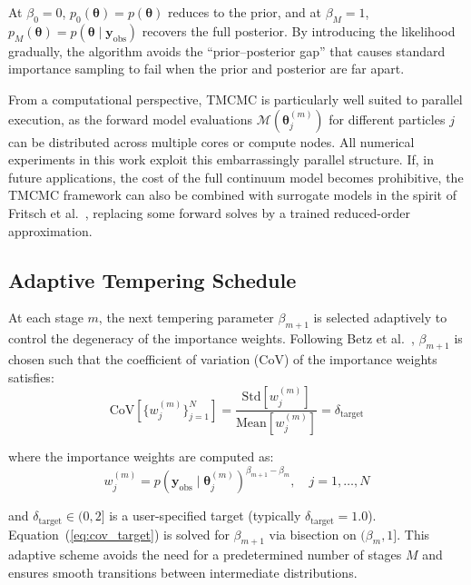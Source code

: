 \documentclass[11pt,a4paper]{article}
\begin{document}
\noindent At $\beta_0 = 0$, $p_0(\boldsymbol{\theta}) = p(\boldsymbol{\theta})$ reduces to the prior, and at $\beta_M = 1$, $p_M(\boldsymbol{\theta}) = p(\boldsymbol{\theta} \mid \mathbf{y}_{\mathrm{obs}})$ recovers the full posterior. By introducing the likelihood gradually, the algorithm avoids the ``prior--posterior gap'' that causes standard importance sampling to fail when the prior and posterior are far apart.

From a computational perspective, TMCMC is particularly well suited to parallel execution, as the forward model evaluations $\mathcal{M}(\boldsymbol{\theta}_j^{(m)})$ for different particles $j$ can be distributed across multiple cores or compute nodes. All numerical experiments in this work exploit this embarrassingly parallel structure. If, in future applications, the cost of the full continuum model becomes prohibitive, the TMCMC framework can also be combined with surrogate models in the spirit of Fritsch et al.~\cite{Fritsch2025BayesianMicrofilms}, replacing some forward solves by a trained reduced-order approximation.

\subsection{Adaptive Tempering Schedule}

At each stage $m$, the next tempering parameter $\beta_{m+1}$ is selected adaptively to control the degeneracy of the importance weights. Following Betz et al.~\cite{Betz2016TMCMC}, $\beta_{m+1}$ is chosen such that the coefficient of variation (CoV) of the importance weights satisfies:
\begin{equation}
\mathrm{CoV}\!\left[\{w_j^{(m)}\}_{j=1}^{N}\right] = \frac{\mathrm{Std}[w_j^{(m)}]}{\mathrm{Mean}[w_j^{(m)}]} = \delta_{\mathrm{target}}
\label{eq:cov_target}
\end{equation}

\noindent where the importance weights are computed as:
\begin{equation}
w_j^{(m)} = p(\mathbf{y}_{\mathrm{obs}} \mid \boldsymbol{\theta}_j^{(m)})^{\beta_{m+1} - \beta_m}, \quad j = 1, \ldots, N
\end{equation}

\noindent and $\delta_{\mathrm{target}} \in (0, 2]$ is a user-specified target (typically $\delta_{\mathrm{target}} = 1.0$). Equation~(\ref{eq:cov_target}) is solved for $\beta_{m+1}$ via bisection on $(\beta_m, 1]$. This adaptive scheme avoids the need for a predetermined number of stages $M$ and ensures smooth transitions between intermediate distributions.
\end{document}
